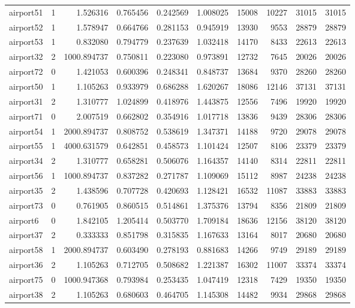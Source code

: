 \begin{longtable}{|l|r|r|r|r|r|r|r|r|r|}
airport51 & 1 & 1.526316 & 0.765456 & 0.242569 & 1.008025 & 15008 & 10227 & 31015 & 31015 \\
airport52 & 1 & 1.578947 & 0.664766 & 0.281153 & 0.945919 & 13930 & 9553 & 28879 & 28879 \\
airport53 & 1 & 0.832080 & 0.794779 & 0.237639 & 1.032418 & 14170 & 8433 & 22613 & 22613 \\
airport32 & 2 & 1000.894737 & 0.750811 & 0.223080 & 0.973891 & 12732 & 7645 & 20026 & 20026 \\
airport72 & 0 & 1.421053 & 0.600396 & 0.248341 & 0.848737 & 13684 & 9370 & 28260 & 28260 \\
airport50 & 1 & 1.105263 & 0.933979 & 0.686288 & 1.620267 & 18086 & 12146 & 37131 & 37131 \\
airport31 & 2 & 1.310777 & 1.024899 & 0.418976 & 1.443875 & 12556 & 7496 & 19920 & 19920 \\
airport71 & 0 & 2.007519 & 0.662802 & 0.354916 & 1.017718 & 13836 & 9439 & 28306 & 28306 \\
airport54 & 1 & 2000.894737 & 0.808752 & 0.538619 & 1.347371 & 14188 & 9720 & 29078 & 29078 \\
airport55 & 1 & 4000.631579 & 0.642851 & 0.458573 & 1.101424 & 12507 & 8106 & 23379 & 23379 \\
airport34 & 2 & 1.310777 & 0.658281 & 0.506076 & 1.164357 & 14140 & 8314 & 22811 & 22811 \\
airport56 & 1 & 1000.894737 & 0.837282 & 0.271787 & 1.109069 & 15112 & 8987 & 24238 & 24238 \\
airport35 & 2 & 1.438596 & 0.707728 & 0.420693 & 1.128421 & 16532 & 11087 & 33883 & 33883 \\
airport73 & 0 & 0.761905 & 0.860515 & 0.514861 & 1.375376 & 13794 & 8356 & 21809 & 21809 \\
airport6 & 0 & 1.842105 & 1.205414 & 0.503770 & 1.709184 & 18636 & 12156 & 38120 & 38120 \\
airport37 & 2 & 0.333333 & 0.851798 & 0.315835 & 1.167633 & 13164 & 8017 & 20680 & 20680 \\
airport58 & 1 & 2000.894737 & 0.603490 & 0.278193 & 0.881683 & 14266 & 9749 & 29189 & 29189 \\
airport36 & 2 & 1.105263 & 0.712705 & 0.508682 & 1.221387 & 16302 & 11007 & 33374 & 33374 \\
airport75 & 0 & 1000.947368 & 0.793984 & 0.253435 & 1.047419 & 12318 & 7429 & 19350 & 19350 \\
airport38 & 2 & 1.105263 & 0.680603 & 0.464705 & 1.145308 & 14482 & 9934 & 29868 & 29868 \\

\end{longtable}
